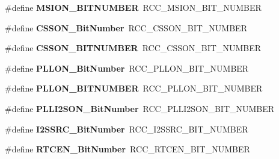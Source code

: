 \begin{DoxyCompactItemize}
\#define {\bfseries M\+S\+I\+O\+N\+\_\+\+B\+I\+T\+N\+U\+M\+B\+ER}~R\+C\+C\+\_\+\+M\+S\+I\+O\+N\+\_\+\+B\+I\+T\+\_\+\+N\+U\+M\+B\+ER
\item 
\mbox{\label{group___h_a_l___r_c_c___aliased_ga253fa44d87aabc55f0cd6628e77a51fd}} 
\#define {\bfseries C\+S\+S\+O\+N\+\_\+\+Bit\+Number}~R\+C\+C\+\_\+\+C\+S\+S\+O\+N\+\_\+\+B\+I\+T\+\_\+\+N\+U\+M\+B\+ER
\item 
\mbox{\label{group___h_a_l___r_c_c___aliased_ga993cf17c844a51d912cf099d4117bd70}} 
\#define {\bfseries C\+S\+S\+O\+N\+\_\+\+B\+I\+T\+N\+U\+M\+B\+ER}~R\+C\+C\+\_\+\+C\+S\+S\+O\+N\+\_\+\+B\+I\+T\+\_\+\+N\+U\+M\+B\+ER
\item 
\mbox{\label{group___h_a_l___r_c_c___aliased_gab24d7f5f8e4b3b717fd91b54f393f6a3}} 
\#define {\bfseries P\+L\+L\+O\+N\+\_\+\+Bit\+Number}~R\+C\+C\+\_\+\+P\+L\+L\+O\+N\+\_\+\+B\+I\+T\+\_\+\+N\+U\+M\+B\+ER
\item 
\mbox{\label{group___h_a_l___r_c_c___aliased_ga1360ce96541cc7c323d3ea4b5b885a64}} 
\#define {\bfseries P\+L\+L\+O\+N\+\_\+\+B\+I\+T\+N\+U\+M\+B\+ER}~R\+C\+C\+\_\+\+P\+L\+L\+O\+N\+\_\+\+B\+I\+T\+\_\+\+N\+U\+M\+B\+ER
\item 
\mbox{\label{group___h_a_l___r_c_c___aliased_gabae59c3e4200523e3aa5b6e10aee8c46}} 
\#define {\bfseries P\+L\+L\+I2\+S\+O\+N\+\_\+\+Bit\+Number}~R\+C\+C\+\_\+\+P\+L\+L\+I2\+S\+O\+N\+\_\+\+B\+I\+T\+\_\+\+N\+U\+M\+B\+ER
\item 
\mbox{\label{group___h_a_l___r_c_c___aliased_ga9561d436b438d8f513b754f1934c3e30}} 
\#define {\bfseries I2\+S\+S\+R\+C\+\_\+\+Bit\+Number}~R\+C\+C\+\_\+\+I2\+S\+S\+R\+C\+\_\+\+B\+I\+T\+\_\+\+N\+U\+M\+B\+ER
\item 
\mbox{\label{group___h_a_l___r_c_c___aliased_ga9302c551752124766afc4cee65436405}} 
\#define {\bfseries R\+T\+C\+E\+N\+\_\+\+Bit\+Number}~R\+C\+C\+\_\+\+R\+T\+C\+E\+N\+\_\+\+B\+I\+T\+\_\+\+N\+U\+M\+B\+ER
\item 
\mbox{\label{group___h_a_l___r_c_c___aliased_ga58db3c6eeaa150182f32e741e2ad8066}} 

\end{DoxyCompactItemize}
